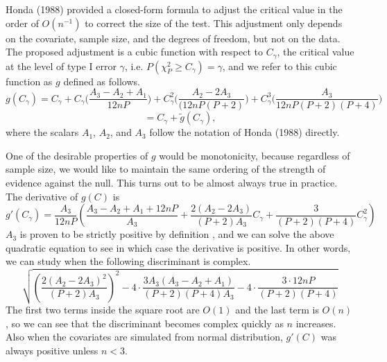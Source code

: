 \documentclass[12pt]{extarticle}
\theoremstyle{theorem}
\begin{document}
\vspace{5mm} \noindent
Honda (1988) provided a closed-form formula to adjust the critical value in the order of $O(n^{-1})$ to correct the size of the test. This adjustment only depends on the covariate, sample size, and the degrees of freedom, but not on the data. The proposed adjustment is a cubic function with respect to $C_{\gamma}$, the critical value at the level of type I error $\gamma$, i.e. $P(\chi_{P}^2 \geq C_{\gamma}) = \gamma$, and we refer to this cubic function as $g$ defined as follows.
\begin{equation}
g(C_{\gamma}) = C_{\gamma} + C_{\gamma}\bigg(\frac{A_3 - A_2 + A_1}{12nP}\bigg) + C_{\gamma}^2\bigg(\frac{A_2 - 2A_3}{(12nP(P+2)}\bigg) + C_{\gamma}^3 \bigg(\frac{A_3}{12nP(P+2)(P+4)}\bigg)
\label{hondacorrection}
\end{equation}
$$ = C_{\gamma} + \tilde{g}(C_{\gamma}),$$
where the scalars $A_1$, $A_2$, and $A_3$ follow the notation of Honda (1988) directly. 

\vspace{5mm} \noindent 
One of the desirable properties of $g$ would be monotonicity, because regardless of sample size, we would like to maintain the same ordering of the strength of evidence against the null. This turns out to be almost always true in practice. The derivative of $g(C)$ is 
$$g'(C_{\gamma}) = \frac{A_3}{12nP}\left( \frac{A_3-A_2+A_1+12nP}{A_3} + 
 \frac{2(A_2-2A_3)}{(P+2)A_3}C_{\gamma} + \frac{3}{(P+2)(P+4)}C_{\gamma}^2
\right)$$
$A_3$ is proven to be strictly positive by definition \cite{cribari1995improved}, and we can solve the above quadratic equation to see in which case the derivative is positive. In other words, we can study when the following discriminant is complex.
$$\sqrt{
\left(\frac{2(A_2-2A_3)^2}{(P+2)A_3}\right)^2 - 4\cdot\frac{3A_3(A_3-A_2+A_1)}{(P+2)(P+4)A_3} - 4\cdot
\frac{3 \cdot 12nP}{(P+2)(P+4)}
}$$
The first two terms inside the square root are $O(1)$ and the last term is $O(n)$, so we can see that the discriminant becomes complex quickly as $n$ increases. Also when the covariates are simulated from normal distribution, $g'(C)$ was always positive unless $n<3$. 
\end{document}

